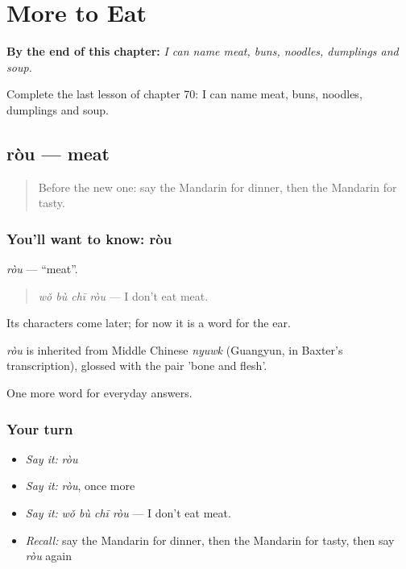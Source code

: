 
\chapter{More to Eat}
\label{ch:zh-more-to-eat}

\begin{chapteropening}
\textbf{By the end of this chapter:} \emph{I can name meat, buns, noodles, dumplings and soup.}

Complete the last lesson of chapter 70: I can name meat, buns, noodles, dumplings and soup.
\end{chapteropening}

\section[ròu]{ròu — meat}

\label{lesson:ZH-C70-rou}



\begin{quote}
Before the new one: say the Mandarin for dinner, then the Mandarin for tasty.
\end{quote}

\subsection*{You'll want to know: ròu}
\emph{ròu} — \textquotedblleft{}meat\textquotedblright{}.

\begin{quote}
\emph{wǒ bù chī ròu} — I don't eat meat.
\end{quote}

Its characters come later; for now it is a word for the ear.

\begin{cousinweb}
\emph{ròu} is inherited from Middle Chinese \emph{nyuwk} (Guangyun, in Baxter's transcription), glossed with the pair 'bone and flesh'.
\end{cousinweb}

\begin{grammarlens}[title={What you've built}]
One more word for everyday answers.
\end{grammarlens}

\subsection*{Your turn}
\begin{itemize}
\raggedright
  \item \emph{Say it:} \emph{ròu}
  \item \emph{Say it:} \emph{ròu}, once more
  \item \emph{Say it:} \emph{wǒ bù chī ròu} — I don't eat meat.
  \item \emph{Recall:} say the Mandarin for dinner, then the Mandarin for tasty, then say \emph{ròu} again
\end{itemize}

